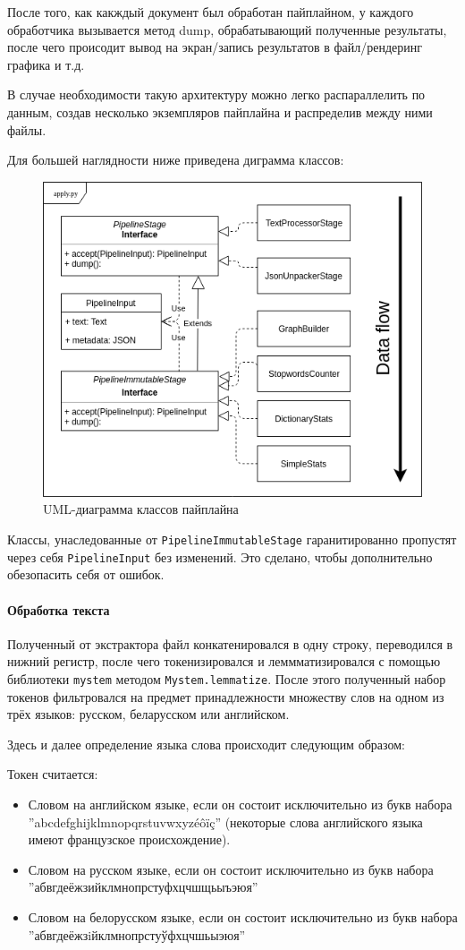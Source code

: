 После того, как какждый документ был обработан пайплайном, у каждого обработчика вызывается метод dump, обрабатывающий полученные результаты, после чего происодит вывод на экран/запись результатов в файл/рендеринг графика и т.д. 

В случае необходимости такую архитектуру можно легко распараллелить по данным, создав несколько экземпляров пайплайна и распределив между ними файлы. 

Для большей наглядности ниже приведена диграмма классов: 

\begin{figure}
	\includegraphics[width=.5\textwidth]{apply_uml_data_flow.png}
	\caption{UML-диаграмма классов пайплайна}
	\label{apply-uml}
\end{figure}

Классы, унаследованные от \texttt{PipelineImmutableStage} гаранитированно пропустят через себя \texttt{PipelineInput} без изменений. Это сделано, чтобы дополнительно обезопасить себя от ошибок.


\paragraph{Обработка текста}

Полученный от экстрактора файл конкатенировался в одну строку, переводился в нижний регистр, после чего токенизировался и леммматизировался с помощью библиотеки \texttt{mystem} методом \texttt{Mystem.lemmatize}. После этого полученный набор токенов фильтровался на предмет принадлежности множеству слов на одном из трёх языков: русском, беларусском или английском. 

Здесь и далее определение языка слова происходит следующим образом:

Токен считается:
\begin{itemize}
	\item Словом на английском языке, если он состоит исключительно из букв набора ''abcdefghijklmnopqrstuvwxyzéôïç'' (некоторые слова английского языка имеют французское происхождение).
	
	\item Словом на русском языке, если он состоит исключительно из букв набора ''абвгдеёжзийклмнопрстуфхцчшщьыъэюя''
	
	\item Словом на белорусском языке, если он состоит исключительно из букв набора ''абвгдеёжзiйклмнопрстуўфхцчшьыэюя''
\end{itemize}

